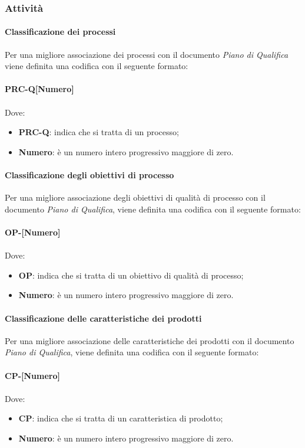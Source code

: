 \subsubsection{Attività}
\paragraph{Classificazione dei processi}
Per una migliore associazione dei processi con il documento \textit{Piano di Qualifica} viene definita una codifica con il seguente formato: \\
\\ \textbf{PRC-Q[Numero]} \\
\\ Dove:
\begin{itemize}
	\item \textbf{PRC-Q}: indica che si tratta di un processo;
	\item \textbf{Numero}: è un numero intero progressivo maggiore di zero.
\end{itemize}

\paragraph{Classificazione degli obiettivi di processo}
Per una migliore associazione degli obiettivi di qualità di processo con il documento \textit{Piano di Qualifica}, viene definita una codifica con il seguente formato: \\
\\ \textbf{OP-[Numero]} \\
\\ Dove:
\begin{itemize}
	\item \textbf{OP}: indica che si tratta di un obiettivo di qualità di processo;
	\item \textbf{Numero}: è un numero intero progressivo maggiore di zero.
\end{itemize}

\paragraph{Classificazione delle caratteristiche dei prodotti}
Per una migliore associazione delle caratteristiche dei prodotti con il documento \textit{Piano di Qualifica}, viene definita una codifica con il seguente formato: \\
\\ \textbf{CP-[Numero]} \\
\\ Dove:
\begin{itemize}
	\item \textbf{CP}: indica che si tratta di un caratteristica di prodotto;
	\item \textbf{Numero}: è un numero intero progressivo maggiore di zero.
\end{itemize}

